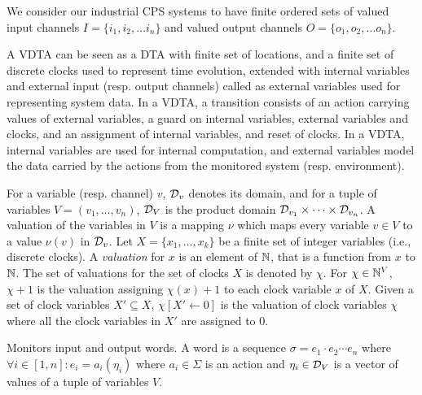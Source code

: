 We consider our industrial \ac{CPS} systems to have finite ordered sets of valued input channels ${I} = \{{i_1}, {i_2}, \ldots {i_n}\}$ and valued output channels ${O} = \{{o_1}, {o_2}, \ldots {o_n}\}$.



A VDTA can be seen as a DTA with finite set of locations, and a finite set of discrete clocks used to represent time evolution, extended with internal variables and external input (resp. output channels) called as external variables used for representing system data.
In a VDTA, a transition consists of an action carrying values of external variables, a guard on internal variables, external variables and clocks, and an assignment of internal variables, and reset of clocks.
In a VDTA, internal variables are used for internal computation, and
external variables model the data carried by the actions from the monitored system (resp. environment). 

%
For a variable (resp. channel) $v$, ${\cal D}_v$ denotes its domain,
and for a tuple of variables $V= (v_1, \ldots, v_n)$,
${\cal D}_V$ is the product domain ${\cal D}_{v_1} \times \cdots \times {\cal D}_{v_n}$.
A valuation of the variables in $V$
is a mapping $\nu$ which maps every variable $v \in V$ to a value $\nu(v)$ in ${\cal D}_v$.
%
Let $X=\{x_1,\ldots, x_k\}$ be a finite set of integer variables (i.e., discrete clocks).
%
A {\em valuation} for $x$ is an element of $\mathbb{N}$, that is a function from $x$ to $\mathbb{N}$.
The set of valuations for the set of clocks $X$ is denoted by $\chi$.
%
For $\chi\in\mathbb{N}^V$, $\chi+1$ is the valuation assigning $\chi(x)+1$ to each clock variable $x$ of $X$.
Given a set of clock variables $X' \subseteq X$, $\chi[X' \leftarrow 0]$ is the valuation of clock variables $\chi$ where all the clock variables in $X'$ are assigned to $0$.

Monitors input and output words. A word is a sequence $\sigma = e_1\cdot e_2 \cdots e_n$ where $\forall i \in [1,n]: e_i = a_i(\eta_i)$ where $a_i \in \Sigma$ is an action and $\eta_i \in {\cal D}_V$ is a vector of values of a tuple of variables $V$. 


